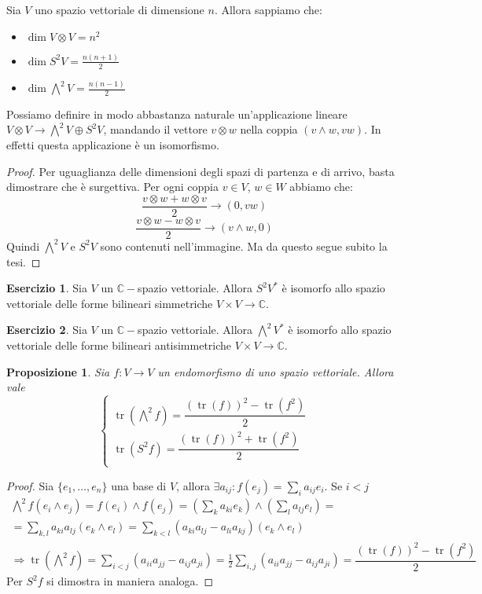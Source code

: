 \documentclass[11pt]{article}
\theoremstyle{plain}
\newtheorem{prop}[thm]{Proposizione}
\theoremstyle{definition}
\newtheorem{exercise}{Esercizio}[section]
\theoremstyle{remark}
\newcommand{\C}{\mathbb{C}}
\DeclareMathOperator{\tr}{tr}
\begin{document}
Sia $V$ uno spazio vettoriale di dimensione $n$. Allora sappiamo che:
\begin{itemize}
\item $\dim V\otimes V = n^2$
\item $\dim S^2V = \frac{n(n+1)}{2}$
\item $\dim \bigwedge^2V = \frac{n(n-1)}{2}$
\end{itemize}
Possiamo definire in modo abbastanza naturale un'applicazione lineare $V\otimes V\to \bigwedge^2V\oplus S^2V$,
mandando il vettore $v\otimes w$ nella coppia $(v\wedge w, vw)$. In effetti questa applicazione è un isomorfismo.
\begin{proof}
Per uguaglianza delle dimensioni degli spazi di partenza e di arrivo, basta dimostrare che è surgettiva.
Per ogni coppia $v\in V$, $w\in W$ abbiamo che:
\[\frac{v\otimes w + w\otimes v}{2} \to (0, vw)\]
\[\frac{v\otimes w - w\otimes v}{2} \to (v\wedge w, 0)\]
Quindi $\bigwedge^2V$ e $S^2V$ sono contenuti nell'immagine. Ma da questo segue subito la tesi.
\end{proof}


\begin{exercise}
Sia $V$ un $\C-$spazio vettoriale. Allora $S^2V^*$ è isomorfo allo spazio vettoriale delle forme bilineari simmetriche $V\times V\to \C$.
\end{exercise}
\begin{exercise}
Sia $V$ un $\C-$spazio vettoriale. Allora $\bigwedge^2V^*$ è isomorfo allo spazio vettoriale delle forme bilineari antisimmetriche $V\times V\to \C$.
\end{exercise}


\begin{prop}
Sia $f: V \to V$ un endomorfismo di uno spazio vettoriale. Allora vale
\[
\begin{cases}
\tr(\bigwedge^2 f ) = \dfrac{(\tr(f))^2 - \tr(f^2)}{2} \\
\tr(S^2 f ) = \dfrac{(\tr(f))^2 + \tr(f^2)}{2} \\
\end{cases}
\]
\label{thm:tracciasymalt}
\end{prop}

\begin{proof} Sia $\{e_1,\ldots,e_n\}$ una base di $V$, allora $\exists a_{ij}: f(e_j)=\sum_i a_{ij}e_i$. Se $i<j$
\begin{gather*}
\bigwedge^2f(e_i\wedge e_j)=f(e_i)\wedge f(e_j)=\left(\sum_k a_{ki}e_k\right)\wedge\left(\sum_l a_{lj}e_l\right)=\\
=\sum_{k,l}a_{ki}a_{lj}(e_k\wedge e_l)=\sum_{k<l}(a_{ki}a_{lj}-a_{li}a_{kj})(e_k\wedge e_l)\\
\Rightarrow \tr(\bigwedge^2f)=\sum_{i<j}(a_{ii}a_{jj}-a_{ij}a_{ji})=\frac{1}{2}\sum_{i,j}(a_{ii}a_{jj}-a_{ij}a_{ji})= \dfrac{(\tr(f))^2 - \tr(f^2)}{2}
\end{gather*}
Per $S^2f$ si dimostra in maniera analoga.
\end{proof}
\end{document}
